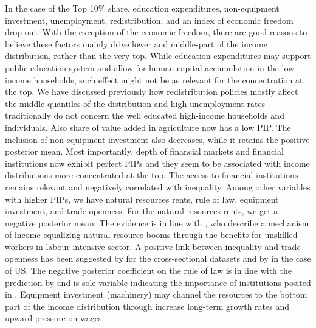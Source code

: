 \documentclass[preprint, nonatbib, 10pt]{elsarticle}
\begin{document}
In the case of the Top 10\% share, education expenditures, non-equipment investment, unemployment, redistribution, and an index of economic freedom drop out. With the exception of the economic freedom, there are good reasons to believe these factors mainly drive lower and middle-part of the income distribution, rather than the very top. While education expenditures may support public education system and allow for human capital accumulation in the low-income households, such effect might not be as relevant for the concentration at the top. We have discussed previously how redistribution policies mostly affect the middle quantiles of the distribution and high unemployment rates traditionally do not concern the well educated high-income households and individuals. Also share of value added in agriculture now has a low \ac{PIP}. The inclusion of non-equipment investment also decreases, while it retains the positive posterior mean. Most importantly, depth of financial markets and financial institutions now exhibit perfect \acp{PIP} and they seem to be associated with income distributions more concentrated at the top. The access to financial institutions remains relevant and negatively correlated with inequality. Among other variables with higher \acp{PIP}, we have natural resources rents, rule of law, equipment investment, and trade openness. For the natural resources rents, we get a negative posterior mean. The evidence is in line with \textcite{goderismalone2011}, who describe a mechanism of income equalizing natural resource booms through the benefits for unskilled workers in labour intensive sector. A positive link between inequality and trade openness has been suggested by \textcite{Jaumotte2013,dabla2015causes} for the cross-sectional datasets and by \textcite{milanovicvan2018inequality} in the case of \ac{US}. The negative posterior coefficient on the rule of law is in line with the prediction by \textcite{perotti2007investor} and is sole variable indicating the importance of institutions posited in \textcite{acemoglu2003cross,acemoglu2015rise}. Equipment investment (machinery) may channel the resources to the bottom part of the income distribution through increase long-term growth rates and upward pressure on wages.
\end{document}
